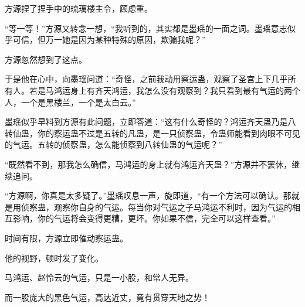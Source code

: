 \begin{this_body}
方源捏了捏手中的琉璃楼主令，顾虑重。

“等一等！”方源又转念一想，“我听到的，其实都是墨瑶的一面之词。墨瑶意志似乎可信，但万一她是因为某种特殊的原因，欺骗我呢？”

方源忽然想到了这点。

于是他在心中，向墨瑶问道：“奇怪，之前我动用察运蛊，观察了圣宫上下几乎所有人。若是马鸿运身上有齐天鸿运，我怎么没有观察到？我只看到最有气运的两个人，一个是黑楼兰，一个是太白云。”

墨瑶似乎早料到方源有此问题，立即答道：“这有什么奇怪的？鸿运齐天蛊乃是八转仙蛊，你的察运蛊不过是五转的凡蛊，是一只侦察蛊，令蛊师能看到肉眼不可见的气运。五转的侦察蛊，怎么能侦察到八转仙蛊的气运呢？”

“既然看不到，那我怎么确信，马鸿运的身上就有鸿运齐天蛊？”方源并不罢休，继续追问。

“方源啊，你真是太多疑了。”墨瑶叹息一声，旋即道，“有一个方法可以确认。那就是用侦察蛊，观察你自身的气运。每当你对气运之子马鸿运不利时，因为气运的相互影响，你的气运将会变得更糟，更坏。你如果不信，完全可以这样查看。”

时间有限，方源立即催动察运蛊。

他的视野，顿时发了变化。

马鸿运、赵怜云的气运，只是一小股，和常人无异。

而一股庞大的黑色气运，高达近丈，竟有贯穿天地之势！

\end{this_body}

